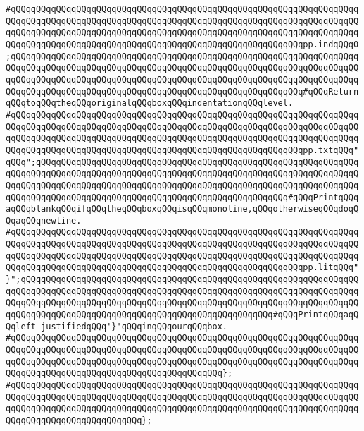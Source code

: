 \verb|#qQQqqQQqqQQqqQQqqQQqqQQqqQQqqQQqqQQqqQQqqQQqqQQqqQQqqQQqqQQqqQQqqQQqqQQqqQQqqQQqqQQqqQQqqQQqqQQqqQQqqQQqqQQqqQQqqQQqqQQqqQQqqQQqqQQqqQQqqQQqqQQqqQQqqQQqqQQqqQQqqQQqqQQqqQQqqQQqqQQqqQQqqQQqqQQqqQQqqQQqqQQqqQQqqQQqqQQqqQQqqQQqqQQqqQQqqQQqqQQqqQQqqQQqqQQqqQQqqQQqqQQqqQQqpp.indqQQq0;qQQqqQQqqQQqqQQqqQQqqQQqqQQqqQQqqQQqqQQqqQQqqQQqqQQqqQQqqQQqqQQqqQQqqQQqqQQqqQQqqQQqqQQqqQQqqQQqqQQqqQQqqQQqqQQqqQQqqQQqqQQqqQQqqQQqqQQqqQQqqQQqqQQqqQQqqQQqqQQqqQQqqQQqqQQqqQQqqQQqqQQqqQQqqQQqqQQqqQQqqQQqqQQqqQQqqQQqqQQqqQQqqQQqqQQqqQQqqQQqqQQqqQQqqQQqqQQqqQQqqQQqqQQq#qQQqReturnqQQqtoqQQqtheqQQqoriginalqQQqboxqQQqindentationqQQqlevel.|\newline
\verb|#qQQqqQQqqQQqqQQqqQQqqQQqqQQqqQQqqQQqqQQqqQQqqQQqqQQqqQQqqQQqqQQqqQQqqQQqqQQqqQQqqQQqqQQqqQQqqQQqqQQqqQQqqQQqqQQqqQQqqQQqqQQqqQQqqQQqqQQqqQQqqQQqqQQqqQQqqQQqqQQqqQQqqQQqqQQqqQQqqQQqqQQqqQQqqQQqqQQqqQQqqQQqqQQqqQQqqQQqqQQqqQQqqQQqqQQqqQQqqQQqqQQqqQQqqQQqqQQqqQQqqQQqqQQqpp.txtqQQq"qQQq";qQQqqQQqqQQqqQQqqQQqqQQqqQQqqQQqqQQqqQQqqQQqqQQqqQQqqQQqqQQqqQQqqQQqqQQqqQQqqQQqqQQqqQQqqQQqqQQqqQQqqQQqqQQqqQQqqQQqqQQqqQQqqQQqqQQqqQQqqQQqqQQqqQQqqQQqqQQqqQQqqQQqqQQqqQQqqQQqqQQqqQQqqQQqqQQqqQQqqQQqqQQqqQQqqQQqqQQqqQQqqQQqqQQqqQQqqQQqqQQqqQQqqQQqqQQqqQQqqQQq#qQQqPrintqQQqaqQQqblankqQQqifqQQqtheqQQqboxqQQqisqQQqmonoline,qQQqotherwiseqQQqdoqQQqaqQQqnewline.|\newline
\verb|#qQQqqQQqqQQqqQQqqQQqqQQqqQQqqQQqqQQqqQQqqQQqqQQqqQQqqQQqqQQqqQQqqQQqqQQqqQQqqQQqqQQqqQQqqQQqqQQqqQQqqQQqqQQqqQQqqQQqqQQqqQQqqQQqqQQqqQQqqQQqqQQqqQQqqQQqqQQqqQQqqQQqqQQqqQQqqQQqqQQqqQQqqQQqqQQqqQQqqQQqqQQqqQQqqQQqqQQqqQQqqQQqqQQqqQQqqQQqqQQqqQQqqQQqqQQqqQQqqQQqqQQqqQQqpp.litqQQq"}";qQQqqQQqqQQqqQQqqQQqqQQqqQQqqQQqqQQqqQQqqQQqqQQqqQQqqQQqqQQqqQQqqQQqqQQqqQQqqQQqqQQqqQQqqQQqqQQqqQQqqQQqqQQqqQQqqQQqqQQqqQQqqQQqqQQqqQQqqQQqqQQqqQQqqQQqqQQqqQQqqQQqqQQqqQQqqQQqqQQqqQQqqQQqqQQqqQQqqQQqqQQqqQQqqQQqqQQqqQQqqQQqqQQqqQQqqQQqqQQqqQQqqQQqqQQqqQQqqQQq#qQQqPrintqQQqaqQQqleft-justifiedqQQq'}'qQQqinqQQqourqQQqbox.|\newline
\verb|#qQQqqQQqqQQqqQQqqQQqqQQqqQQqqQQqqQQqqQQqqQQqqQQqqQQqqQQqqQQqqQQqqQQqqQQqqQQqqQQqqQQqqQQqqQQqqQQqqQQqqQQqqQQqqQQqqQQqqQQqqQQqqQQqqQQqqQQqqQQqqQQqqQQqqQQqqQQqqQQqqQQqqQQqqQQqqQQqqQQqqQQqqQQqqQQqqQQqqQQqqQQqqQQqqQQqqQQqqQQqqQQqqQQqqQQqqQQqqQQqqQQqqQQqqQQq};|\newline
\verb|#qQQqqQQqqQQqqQQqqQQqqQQqqQQqqQQqqQQqqQQqqQQqqQQqqQQqqQQqqQQqqQQqqQQqqQQqqQQqqQQqqQQqqQQqqQQqqQQqqQQqqQQqqQQqqQQqqQQqqQQqqQQqqQQqqQQqqQQqqQQqqQQqqQQqqQQqqQQqqQQqqQQqqQQqqQQqqQQqqQQqqQQqqQQqqQQqqQQqqQQqqQQqqQQqqQQqqQQqqQQqqQQqqQQqqQQqqQQq};|\newline
